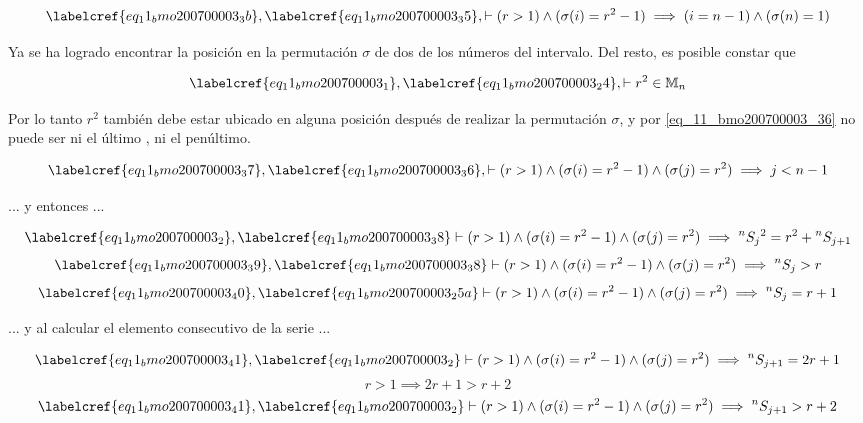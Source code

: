 \begin{equation} \label{eq_11_bmo200700003_36}
	\labelcref{eq_11_bmo200700003_3b}, \labelcref{eq_11_bmo200700003_35}, \vdash (r>1) \land (\sigma(i) = r^2-1) \implies (i=n-1) \land (\sigma(n) = 1)
\end{equation}

Ya se ha logrado encontrar la posición en la permutación $\sigma$ de dos de los números del intervalo. Del resto, es posible constar que 

\begin{equation} \label{eq_11_bmo200700003_37}
	\labelcref{eq_11_bmo200700003_1}, \labelcref{eq_11_bmo200700003_24}, \vdash r^2 \in \mathbb{M}_n
\end{equation}

Por lo tanto $r^2$ también debe estar ubicado en alguna posición después de realizar la permutación $\sigma$, y por \cref{eq_11_bmo200700003_36} no puede ser ni el último , ni el penúltimo. 

\begin{equation} \label{eq_11_bmo200700003_38}
		\labelcref{eq_11_bmo200700003_37}, \labelcref{eq_11_bmo200700003_36}, \vdash (r>1) \land (\sigma(i) = r^2-1) \land (\sigma(j) = r^2) \implies j < n-1
\end{equation}

... y entonces ...

\begin{equation} \label{eq_11_bmo200700003_39}
	\labelcref{eq_11_bmo200700003_2}, \labelcref{eq_11_bmo200700003_38} \vdash (r>1) \land (\sigma(i) = r^2-1) \land (\sigma(j) = r^2) \implies \prescript{n}{}{S_j}^2 = r^2 + \prescript{n}{}{S_{j+1}}
\end{equation}
\begin{equation} \label{eq_11_bmo200700003_40}
	\labelcref{eq_11_bmo200700003_39}, \labelcref{eq_11_bmo200700003_38} \vdash (r>1) \land (\sigma(i) = r^2-1) \land (\sigma(j) = r^2) \implies \prescript{n}{}{S_j} > r
\end{equation}
\begin{equation} \label{eq_11_bmo200700003_41}
	\labelcref{eq_11_bmo200700003_40}, \labelcref{eq_11_bmo200700003_25a} \vdash (r>1) \land (\sigma(i) = r^2-1) \land (\sigma(j) = r^2) \implies \prescript{n}{}{S_j} = r+1
\end{equation}

... y al calcular el elemento consecutivo de la serie ...

\begin{equation} \label{eq_11_bmo200700003_42}
	\labelcref{eq_11_bmo200700003_41}, \labelcref{eq_11_bmo200700003_2} \vdash (r>1) \land (\sigma(i) = r^2-1) \land (\sigma(j) = r^2) \implies \prescript{n}{}{S_{j+1}} = 2r+1
\end{equation}
\begin{equation} \label{eq_11_bmo200700003_43}
	r>1 \implies 2r+1 > r+2
\end{equation}
\begin{equation} \label{eq_11_bmo200700003_44}
	\labelcref{eq_11_bmo200700003_41}, \labelcref{eq_11_bmo200700003_2} \vdash (r>1) \land (\sigma(i) = r^2-1) \land (\sigma(j) = r^2) \implies \prescript{n}{}{S_{j+1}} > r+2
\end{equation}

